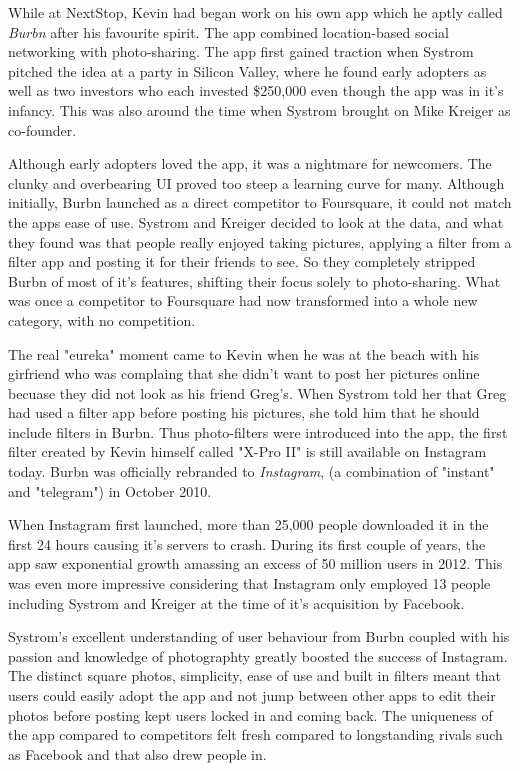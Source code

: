 \documentclass[12pt]{article}
\begin{document}
    While at NextStop, Kevin had began work on his own app which he 
    aptly called \textit{Burbn} after  his favourite spirit. The app combined location-based social networking with photo-sharing.
    The app first gained traction when Systrom
    pitched the idea at a party in Silicon Valley, where he found early adopters as well as two investors who each
    invested \$250,000 even though the app was in it's infancy. This was also around the time when Systrom brought on Mike Kreiger as co-founder.

    Although early adopters loved the app, it was a nightmare for newcomers. The clunky and overbearing UI proved too steep a learning curve for many. 
    Although initially, Burbn launched
    as a direct competitor to Foursquare, it could not match the apps ease of use. Systrom and Kreiger decided to look at the data,
    and what they found was that people really enjoyed taking pictures, applying a filter from a filter app and posting it for their friends to see. So they completely stripped Burbn of 
    most of it's features, shifting their focus solely to photo-sharing. What was once a competitor to Foursquare had now transformed into a whole new category, with no competition.

    The real "eureka" moment came to Kevin when he was at the beach with his girfriend who was complaing that she didn't want to post
    her pictures online becuase they did not look as his friend Greg's. When Systrom told her that Greg had used a filter app before posting
    his pictures, she told him that he should include filters in Burbn. Thus photo-filters were introduced into the app, the first filter
    created by Kevin himself called "X-Pro II" is still available on Instagram today. Burbn was officially rebranded to \textit{Instagram}, (a combination of "instant" and "telegram") in
    October 2010.

    When Instagram first launched, more than 25,000 people downloaded it in the first 24 hours causing it's servers to crash.
    During its first couple of years, the app saw exponential growth amassing an excess of 50 million users in 2012. This was even more impressive
    considering that Instagram only employed 13 people including Systrom and Kreiger at the time of it's acquisition by Facebook.

    Systrom's excellent understanding of user behaviour from Burbn coupled with his passion and knowledge of photographty greatly boosted the success of Instagram.
    The distinct square photos, simplicity, ease of use and built in filters meant that users could easily adopt the app and not jump between other apps to edit their photos
    before posting kept users locked in and coming back. The uniqueness of the app compared to competitors felt fresh compared to longstanding rivals such as Facebook and that also drew people in.
\end{document}
